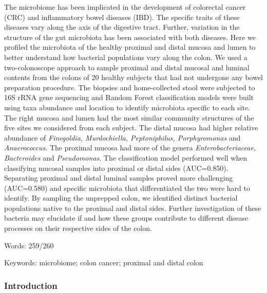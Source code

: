 \documentclass[12pt,]{article}
\begin{document}
The microbiome has been implicated in the development of colorectal
cancer (CRC) and inflammatory bowel diseases (IBD). The specific traits
of these diseases vary along the axis of the digestive tract. Further,
variation in the structure of the gut microbiota has been associated
with both diseases. Here we profiled the microbiota of the healthy
proximal and distal mucosa and lumen to better understand how bacterial
populations vary along the colon. We used a two-colonoscope approach to
sample proximal and distal mucosal and luminal contents from the colons
of 20 healthy subjects that had not undergone any bowel preparation
procedure. The biopsies and home-collected stool were subjected to 16S
rRNA gene sequencing and Random Forest classification models were built
using taxa abundance and location to identify microbiota specific to
each site. The right mucosa and lumen had the most similar community
structures of the five sites we considered from each subject. The distal
mucosa had higher relative abundance of \emph{Finegoldia, Murdochiella,
Peptoniphilus, Porphyromonas} and \emph{Anaerococcus}. The proximal
mucosa had more of the genera \emph{Enterobacteriaceae, Bacteroides} and
\emph{Pseudomonas}. The classification model performed well when
classifying mucosal samples into proximal or distal sides (AUC=0.850).
Separating proximal and distal luminal samples proved more challenging
(AUC=0.580) and specific microbiota that differentiated the two were
hard to identify. By sampling the unprepped colon, we identified
distinct bacterial populations native to the proximal and distal sides.
Further investigation of these bacteria may elucidate if and how these
groups contribute to different disease processes on their respective
sides of the colon.

Words: 259/260

Keywords: microbiome; colon cancer; proximal and distal colon

\subsubsection{Introduction}\label{introduction}
\end{document}
